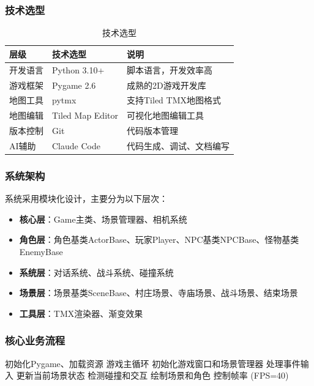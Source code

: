 \documentclass[12pt,a4paper]{article}
\begin{document}
\subsubsection{技术选型}

\begin{table}[H]
\centering
\caption{技术选型}
\renewcommand{\arraystretch}{1.3}
\begin{tabularx}{\textwidth}{>{\centering\arraybackslash}m{2.5cm}>{\centering\arraybackslash}m{3cm}>{\centering\arraybackslash}m{6cm}}
\toprule
\textbf{层级} & \textbf{技术选型} & \textbf{说明} \\
\midrule
开发语言 & Python 3.10+ & 脚本语言，开发效率高 \\
游戏框架 & Pygame 2.6 & 成熟的2D游戏开发库 \\
地图工具 & pytmx & 支持Tiled TMX地图格式 \\
地图编辑 & Tiled Map Editor & 可视化地图编辑工具 \\
版本控制 & Git & 代码版本管理 \\
AI辅助 & Claude Code & 代码生成、调试、文档编写 \\
\bottomrule
\end{tabularx}
\end{table}

\subsubsection{系统架构}

系统采用模块化设计，主要分为以下层次：

\begin{itemize}
    \item \textbf{核心层}：Game主类、场景管理器、相机系统
    \item \textbf{角色层}：角色基类ActorBase、玩家Player、NPC基类NPCBase、怪物基类EnemyBase
    \item \textbf{系统层}：对话系统、战斗系统、碰撞系统
    \item \textbf{场景层}：场景基类SceneBase、村庄场景、寺庙场景、战斗场景、结束场景
    \item \textbf{工具层}：TMX渲染器、渐变效果
\end{itemize}

\subsubsection{核心业务流程}

\begin{algorithm}[H]
\caption{游戏主循环流程}
\begin{algorithmic}[1]
\REQUIRE 初始化Pygame、加载资源
\ENSURE 游戏主循环
\STATE 初始化游戏窗口和场景管理器
    \STATE 处理事件输入
    \STATE 更新当前场景状态
    \STATE 检测碰撞和交互
    \STATE 绘制场景和角色
    \STATE 控制帧率 (FPS=40)
\ENDWHILE
\end{algorithmic}
\end{algorithm}
\end{document}
